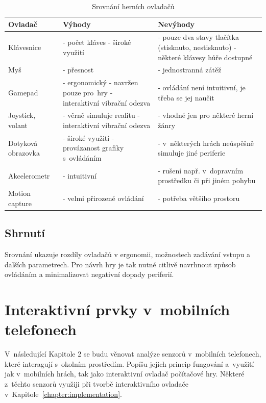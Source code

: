 \documentclass[thesis=B,czech,hidelinks]{FITthesis}[2012/06/26] %
\begin{document}
\begin{table}[h]
\caption{Srovnání herních ovladačů}
\begin{tabularx}{\textwidth}{|l|X|X|}
\hline
\textbf{Ovladač} & \textbf{Výhody} & \textbf{Nevýhody} \\ \hline
Klávesnice & - počet kláves \newline - široké využití & - pouze dva stavy tlačítka (stisknuto, nestisknuto) \newline - některé klávesy hůře dos\-tup\-né \\ \hline
Myš & - přesnost & - jednostranná zátěž \\ \hline
Gamepad & - ergonomický \newline - navržen pouze pro~hry \newline - interaktivní vibrační o\-dez\-va & - ovládání není in\-tui\-tiv\-ní, je třeba se jej naučit \\ \hline
Joystick, volant & - věrně simuluje realitu \newline - interaktivní vibrační o\-dez\-va & - vhodné jen pro některé herní žánry \\ \hline
Dotyková obrazovka & - široké využití \newline - provázanost grafiky s~o\-vlá\-dá\-ním & - v~některých hrách ne\-úspěšně simuluje jiné periferie \\ \hline
Akcelerometr & - intuitivní & - rušení např. v~dopravním prostředku či při jiném pohybu \\ \hline
Motion capture & - velmi přirozené o\-vlá\-dá\-ní & - potřeba většího pros\-to\-ru \\ \hline

\end{tabularx}
\end{table}

\section{Shrnutí}

Srovnání ukazuje rozdíly ovladačů v ergonomii, možnostech zadávání vstupu a dalších parametrech. Pro návrh hry je tak nutné citlivě navrhnout způsob ovládáním a minimalizovat negativní dopady periferií. 

\chapter{Interaktivní prvky v~mobilních telefonech}

V~následující Kapitole 2 se budu věnovat analýze senzorů v~mobilních telefonech, které interagují s~okolním prostředím. Popíšu jejich princip fungování a~využití jak v~mobilních hrách, tak jako interaktivní ovladač počítačové hry. Některé z~těchto senzorů využiji při tvorbě interaktivního ovladače v~Kapitole~\ref{chapter:implementation}.
\end{document}
